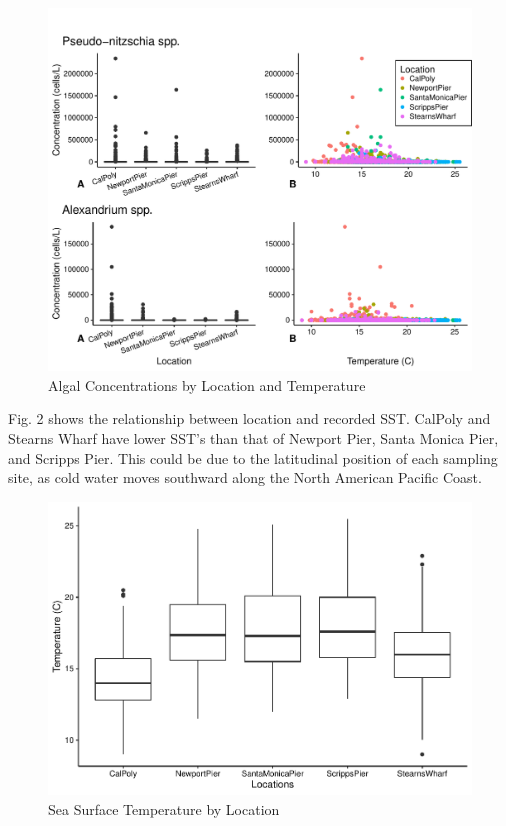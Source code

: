 \documentclass[
  12pt,
]{article}
\begin{document}
\begin{figure}
\centering
\includegraphics{Habs_Final_Report_files/figure-latex/Exploratory Analysis-1.pdf}
\caption{Algal Concentrations by Location and Temperature}
\end{figure}

\newpage

Fig. 2 shows the relationship between location and recorded SST. CalPoly
and Stearns Wharf have lower SST's than that of Newport Pier, Santa
Monica Pier, and Scripps Pier. This could be due to the latitudinal
position of each sampling site, as cold water moves southward along the
North American Pacific Coast.

\begin{figure}
\centering
\includegraphics{Habs_Final_Report_files/figure-latex/Exploratory Analysis Part 2 SST-1.pdf}
\caption{Sea Surface Temperature by Location}
\end{figure}
\end{document}
